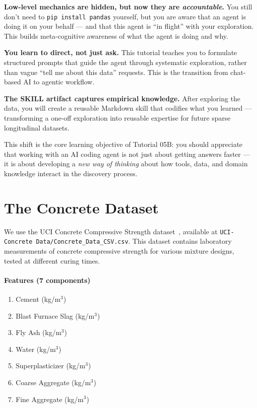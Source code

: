 \documentclass[11pt]{article}
\begin{document}
\begin{def-box}
\textbf{Low-level mechanics are hidden, but now they are \emph{accountable}.}  You still don't need to \texttt{pip install pandas} yourself, but you are aware that an agent is doing it on your behalf --- and that this agent is ``in flight'' with your exploration.  This builds meta-cognitive awareness of what the agent is doing and why.
\end{def-box}

\begin{def-box}
\textbf{You learn to direct, not just ask.}  This tutorial teaches you to formulate structured prompts that guide the agent through systematic exploration, rather than vague ``tell me about this data'' requests.  This is the transition from chat-based AI to agentic workflow.
\end{def-box}

\begin{def-box}
\textbf{The SKILL artifact captures empirical knowledge.}  After exploring the data, you will create a reusable Markdown skill that codifies what you learned --- transforming a one-off exploration into reusable expertise for future sparse longitudinal datasets.
\end{def-box}

This shift is the core learning objective of Tutorial 05B: you should appreciate that working with an AI coding agent is not just about getting answers faster --- it is about developing a \emph{new way of thinking} about how tools, data, and domain knowledge interact in the discovery process.

\section{The Concrete Dataset}
\label{sec:dataset}

We use the UCI Concrete Compressive Strength dataset~\cite{yeh1998}, available at \texttt{UCI-Concrete Data/Concrete\_Data\_CSV.csv}.  This dataset contains laboratory measurements of concrete compressive strength for various mixture designs, tested at different curing times.

\paragraph{Features (7 components)}
\begin{enumerate}[nosep]
  \item Cement (kg/m$^3$)
  \item Blast Furnace Slag (kg/m$^3$)
  \item Fly Ash (kg/m$^3$)
  \item Water (kg/m$^3$)
  \item Superplasticizer (kg/m$^3$)
  \item Coarse Aggregate (kg/m$^3$)
  \item Fine Aggregate (kg/m$^3$)
\end{enumerate}
\end{document}
